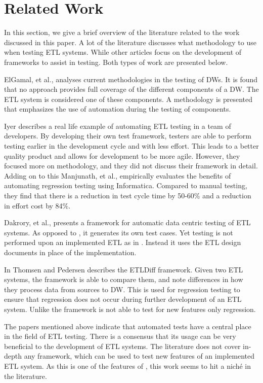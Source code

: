 \section{Related Work}\label{sect:RelatedWork}
In this section, we give a brief overview of the literature related to the work discussed in this paper. A lot of the literature discusses what methodology to use when testing ETL systems. While other articles focus on the development of frameworks to assist in testing. Both types of work are presented below.

ElGamal, et al., \cite{elgamal2012towards} analyses current methodologies in the testing of DWs. It is found that no approach provides full coverage of the different components of a DW. The ETL system is considered one of these components. A methodology is presented that emphasizes the use of automation during the testing of components.

Iyer \cite{subuiyer2014} describes a real life example of automating ETL testing in a team of developers. By developing their own test framework, testers are able to perform testing earlier in the development cycle and with less effort. This leads to a better quality product and allows for development to be more agile. However, they focused more on methodology, and they did not discuss their framework in detail. Adding on to this Manjunath, et al., \cite{manjunath2012case} empirically evaluates the benefits of automating regression testing using Informatica. Compared to manual testing, they find that there is a reduction in test cycle time by 50-60\% and a reduction in effort cost by 84\%.

Dakrory, et al., \cite{dakroryautomated} presents a framework for automatic data centric testing of ETL systems. As opposed to \FW{}, it generates its own test cases. Yet testing is not performed upon an implemented ETL as in \FW{}. Instead it uses the ETL design documents in place of the implementation.

In \cite{thomsen2006etldiff} Thomsen and Pedersen describes the ETLDiff framework. Given two ETL systems, the framework is able to compare them, and note differences in how they process data from sources to DW. This is used for regression testing to ensure that regression does not occur during further development of an ETL system. Unlike \FW{} the framework is not able to test for new features only regression.

The papers mentioned above indicate that automated tests have a central place in the field of ETL testing. There is a consensus that its usage can be very beneficial to the development of ETL systems. The literature does not cover in-depth any framework, which can be used to test new features of an implemented ETL system. As this is one of the features of \FW{}, this work seems to hit a niché in the literature. 

